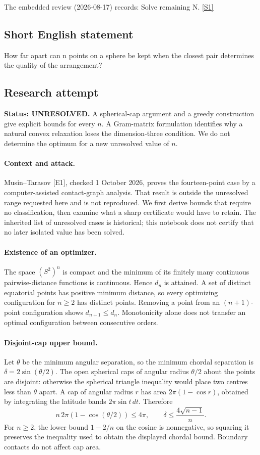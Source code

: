 \documentclass[11pt,a4paper]{article}
\newcommand{\sref}[2]{\hyperlink{source:#1:#2}{[S#2]}}
\begin{document}
The embedded review (2026-08-17) records: Solve remaining N. \sref{statement}{1}

\subsection{Short English statement}

How far apart can n points on a sphere be kept when the closest pair determines the quality of the arrangement?

\subsection{Research attempt}
\textbf{Status: UNRESOLVED.} A spherical-cap argument and a greedy construction give explicit bounds for every $n$. A Gram-matrix formulation identifies why a natural convex relaxation loses the dimension-three condition. We do not determine the optimum for a new unresolved value of $n$.

\paragraph{Context and attack.}
Musin--Tarasov [E1], checked 1 October 2026, proves the fourteen-point case by a computer-assisted contact-graph analysis. That result is outside the unresolved range requested here and is not reproduced. We first derive bounds that require no classification, then examine what a sharp certificate would have to retain. The inherited list of unresolved cases is historical; this notebook does not certify that no later isolated value has been solved.

\paragraph{Existence of an optimizer.}
The space $(S^2)^n$ is compact and the minimum of its finitely many continuous pairwise-distance functions is continuous. Hence $d_n$ is attained. A set of distinct equatorial points has positive minimum distance, so every optimizing configuration for $n\ge2$ has distinct points. Removing a point from an $(n+1)$-point configuration shows $d_{n+1}\le d_n$. Monotonicity alone does not transfer an optimal configuration between consecutive orders.

\paragraph{Disjoint-cap upper bound.}
Let $\theta$ be the minimum angular separation, so the minimum chordal separation is $\delta=2\sin(\theta/2)$. The open spherical caps of angular radius $\theta/2$ about the points are disjoint: otherwise the spherical triangle inequality would place two centres less than $\theta$ apart. A cap of angular radius $r$ has area $2\pi(1-\cos r)$, obtained by integrating the latitude bands $2\pi\sin t\,dt$. Therefore
\[
n\,2\pi(1-\cos(\theta/2))\le4\pi,
\qquad \delta\le\frac{4\sqrt{n-1}}{n}.
\]
For $n\ge2$, the lower bound $1-2/n$ on the cosine is nonnegative, so squaring it preserves the inequality used to obtain the displayed chordal bound. Boundary contacts do not affect cap area.
\end{document}
